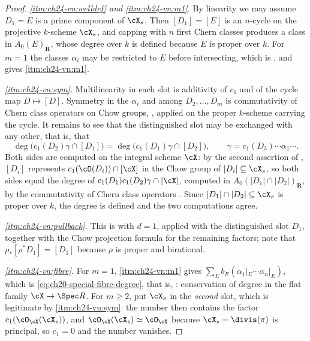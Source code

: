 \begin{proof}
\emph{\cref{itm:ch24-vn:welldef} and \cref{itm:ch24-vn:m1}.}  By linearity we
may assume \(D_1=E\) is a prime component of \(\cX_s\).  Then
\([D_1]=[E]\) is an \(n\)-cycle on the projective \(k\)-scheme \(\cX_s\), and
capping with \(n\) first Chern classes produces a class in
\(A_0(E)_{\mathbf R}\), whose degree over \(k\) is defined because \(E\) is
proper over \(k\).  For \(m=1\) the classes \(\alpha_i\) may be restricted to
\(E\) before intersecting, which is ,
and gives \cref{itm:ch24-vn:m1}.

\emph{\cref{itm:ch24-vn:sym}.}  Multilinearity in each slot is additivity of
\(c_1\) and of the cycle map \(D\mapsto[D]\).  Symmetry in the
\(\alpha_i\) and among \(D_2,\ldots,D_m\) is commutativity of Chern class
operators on Chow groups, , applied on the
proper \(k\)-scheme carrying the cycle.  It remains to see that the
distinguished slot may be exchanged with any other, that is, that
\[
 \deg\bigl(c_1(D_2)\gamma\cap[D_1]\bigr)
 =\deg\bigl(c_1(D_1)\gamma\cap[D_2]\bigr),
 \qquad
 \gamma=c_1(D_3)\cdots\alpha_1\cdots .
\]
Both sides are computed on the integral scheme \(\cX\): by the second
assertion of , \([D_i]\) represents
\(c_1(\cO(D_i))\cap[\cX]\) in the Chow group of \(|D_i|\subseteq\cX_s\), so
both sides equal the degree of
\(c_1(D_1)c_1(D_2)\gamma\cap[\cX]\), computed in
\(A_0(|D_1|\cap|D_2|)_{\mathbf R}\), by the commutativity of Chern class
operators \cite[Corollary~2.4.2]{Ful}.  Since \(|D_1|\cap|D_2|\subseteq\cX_s\)
is proper over \(k\), the degree is defined and the two computations agree.

\emph{\cref{itm:ch24-vn:pullback}.}  This is
 with \(d=1\), applied with the
distinguished slot \(D_1\), together with the Chow projection formula
 for the remaining factors; note that
\(\rho_*[\rho^*D_1]=[D_1]\) because \(\rho\) is proper and birational.

\emph{\cref{itm:ch24-vn:fibre}.}  For \(m=1\), \cref{itm:ch24-vn:m1} gives
\(\sum_Eb_E(\alpha_1|_E\cdots\alpha_n|_E)\), which is
\eqref{eq:ch20-special-fibre-degree}, that is,
: conservation of degree in the flat family
\(\cX\to\Spec R\).  For \(m\geq2\), put \(\cX_s\) in the \emph{second} slot,
which is legitimate by \cref{itm:ch24-vn:sym}: the number then contains the
factor \(c_1(\cO_{\cX}(\cX_s))\), and \(\cO_{\cX}(\cX_s)\simeq\cO_{\cX}\)
because \(\cX_s=\divis(\pi)\) is principal, so \(c_1=0\) and the number
vanishes.
\end{proof}

